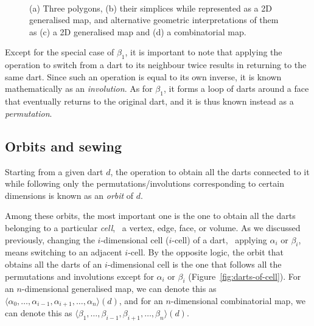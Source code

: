 \begin{figure}
\begin{subfigure}{0.33\linewidth}
\caption{}%
\label{subfig:2dcc-betas}
\end{subfigure}\\
\caption{(a) Three polygons, (b) their simplices while represented as a 2D generalised map, and alternative geometric interpretations of them as (c) a 2D generalised map and (d) a combinatorial map.}%
\label{fig:2dcc}
\end{figure}

Except for the special case of \(\beta_1\), it is important to note that applying the operation to switch from a dart to its neighbour twice results in returning to the same dart.
Since such an operation is equal to its own inverse, it is known mathematically as an \emph{involution}.
As for \(\beta_1\), it forms a loop of darts around a face that eventually returns to the original dart, and it is thus known instead as a \emph{permutation}.

\subsection{Orbits and sewing}

Starting from a given dart \(d\), the operation to obtain all the darts connected to it while following only the permutations/involutions corresponding to certain dimensions is known as an \emph{orbit} of \(d\).

Among these orbits, the most important one is the one to obtain all the darts belonging to a particular \emph{cell}, \ie\ a vertex, edge, face, or volume.
As we discussed previously, changing the \(i\)-dimensional cell (\(i\)-cell) of a dart, \ie\ applying \(\alpha_i\) or \(\beta_i\), means switching to an adjacent \(i\)-cell.
By the opposite logic, the orbit that obtains all the darts of an \(i\)-dimensional cell is the one that follows all the permutations and involutions except for \(\alpha_i\) or \(\beta_i\) (Figure~\ref{fig:darts-of-cell}).
For an \(n\)-dimensional generalised map, we can denote this as \(\langle \alpha_0, \ldots, \alpha_{i-1}, \alpha_{i+1}, \ldots, \alpha_n \rangle(d)\), and for an \(n\)-dimensional combinatorial map, we can denote this as \(\langle \beta_1, \ldots, \beta_{i-1}, \beta_{i+1}, \ldots, \beta_n \rangle(d)\).

